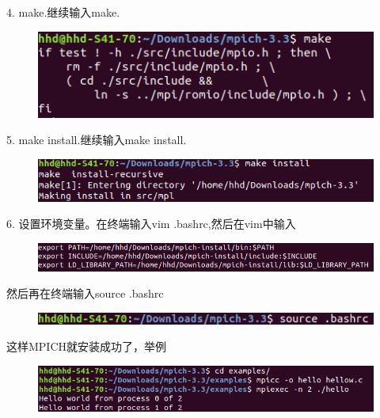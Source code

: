\documentclass[12pt,a4paper]{article}
\begin{document}
4. make.继续输入make.
\begin{figure}[H]
\centering
\includegraphics[scale=0.5]{./figures/4.png}
\caption{}
\end{figure}

5. make install.继续输入make install.
\begin{figure}[H]
\centering
\includegraphics[scale=0.5]{./figures/5.png}
\caption{}
\end{figure}

6. 设置环境变量。在终端输入vim .bashrc,然后在vim中输入
\begin{figure}[H]
\centering
\includegraphics[scale=0.5]{./figures/38.png}
\caption{}
\end{figure}

然后再在终端输入source .bashrc
\begin{figure}[H]
\centering
\includegraphics[scale=0.5]{./figures/7.png}
\caption{}
\end{figure}

这样MPICH就安装成功了，举例
\begin{figure}[H]
\centering
\includegraphics[scale=0.5]{./figures/8.png}
\caption{}
\end{figure}






%
\end{document}

